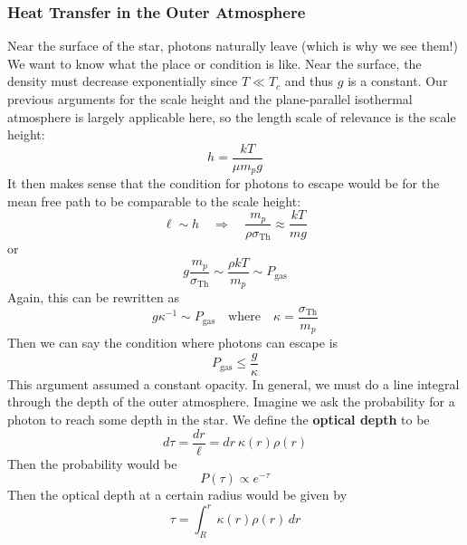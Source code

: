 \documentclass[10pt]{article}
\numberwithin{equation}{section}
\begin{document}
	\subsubsection{Heat Transfer in the Outer Atmosphere}
	Near the surface of the star, photons naturally leave (which is why we 
see them!) We want to know what the place or condition is like. Near the 
surface, the density must decrease exponentially since $T\ll T_c$ and thus 
$g$ is a constant. Our previous arguments for the scale height and the 
plane-parallel isothermal atmosphere is largely applicable here, so the 
length scale of relevance is the scale height:
	\begin{equation}
		\label{HTS.42} h=\frac{kT}{\mu m_p g}
	\end{equation}
	It then makes sense that the condition for photons to escape would be 
for the mean free path to be comparable to the scale height:
	\begin{equation}
		\label{HTS.43} \ell\sim h\quad\Rightarrow\quad \frac{m_p}{\rho
\sigma_{\mathrm{Th}}}\approx \frac{kT}{mg}
	\end{equation}
	or
	\begin{equation}
		\label{HTS.44} g\frac{m_p}{\sigma_{\mathrm{Th}}}\sim\frac{\rho kT}
{m_p}\sim P_{\mathrm{gas}}
	\end{equation}
	Again, this can be rewritten as
	\begin{equation}
		\label{HTS.45} g\kappa^{-1}\sim P_{\mathrm{gas}}\quad\mathrm{where}
\quad \kappa=\frac{\sigma_{\mathrm{Th}}}{m_p}
	\end{equation}
	Then we can say the condition where photons can escape is
	\begin{equation}
		\label{HTS.46} P_{\mathrm{gas}}\leq \frac{g}{\kappa}
	\end{equation}
	This argument assumed a constant opacity. In general, we must
        do a line integral through the depth of the outer
        atmosphere. Imagine we ask the probability for a photon to
        reach some depth in the star. We define the \textbf{optical
          depth} to be
	\begin{equation}
		\label{HTS.47} d\tau = \frac{dr}{\ell}=dr\ \kappa(r)\rho(r)
	\end{equation}
	Then the probability would be
	\begin{equation}
		\label{HTS.48} P(\tau)\propto e^{-\tau}
	\end{equation}
	Then the optical depth at a certain radius would be given by
	\begin{equation}
		\label{HTS.49} \tau = \int_R^r\kappa(r)\rho(r)\,dr
	\end{equation}
\end{document}

